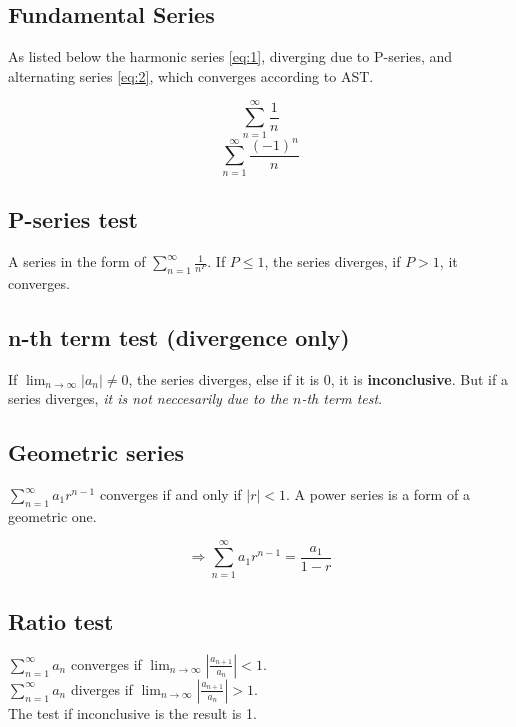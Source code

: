 \subsection{Fundamental Series}

As listed below the harmonic series \ref{eq:1}, diverging due to P-series, and alternating series \ref{eq:2}, which converges according to AST.

\begin{equation}\label{eq:1}
    \sum_{n=1}^{\infty}\frac{1}{n}
\end{equation}
\begin{equation}\label{eq:2}
    \sum_{n=1}^{\infty}\frac{(-1)^n}{n}
\end{equation}

\subsection{P-series test}

A series in the form of $\sum_{n=1}^{\infty}\frac{1}{n^P}$.
If $P\leq{1}$, the series diverges, if $P>1$, it converges.

\subsection{n-th term test (divergence only)}

If $\lim_{n\to{\infty}}|a_n|\neq{0}$, the series diverges, else if it is 0, it is \textbf{inconclusive}.
But if a series diverges, \emph{it is not neccesarily due to the $n$-th term test}.

\subsection{Geometric series}

$\sum_{n=1}^{\infty}a_1r^{n-1}$ converges if and only if $|r|<1$.
A power series is a form of a geometric one.

\[\Rightarrow \sum_{n=1}^{\infty}a_1r^{n-1}=\frac{a_1}{1-r}\]

\subsection{Ratio test}

$\sum_{n=1}^{\infty}a_n$ converges if $\lim_{n\to{\infty}}|\frac{a_{n+1}}{a_n}|<1$.\\
$\sum_{n=1}^{\infty}a_n$ diverges if $\lim_{n\to{\infty}}|\frac{a_{n+1}}{a_n}|>1$.\\
The test if inconclusive is the result is 1.


